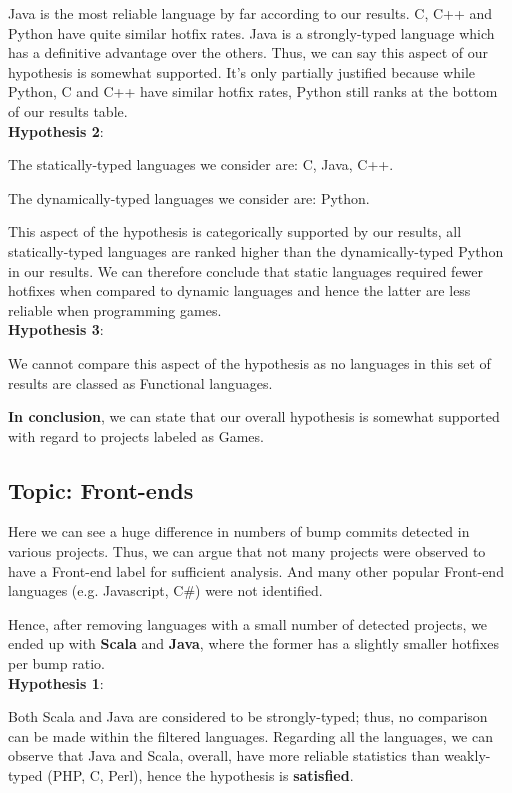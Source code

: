 Java is the most reliable language by far according to our results. C, C++ and Python have quite similar hotfix rates. Java is a strongly-typed language which has a definitive advantage over the others. Thus, we can say this aspect of our hypothesis is somewhat supported. It’s only partially justified because while Python, C and C++ have similar hotfix rates, Python still ranks at the bottom of our results table.\\

\textbf{Hypothesis 2}:\par

The statically-typed languages we consider are: C, Java, C++.\par
The dynamically-typed languages we consider are: Python.\par

This aspect of the hypothesis is categorically supported by our results, all statically-typed languages are ranked higher than the dynamically-typed Python in our results. We can therefore conclude that static languages required fewer hotfixes when compared to dynamic languages and hence the latter are less reliable when programming games.\\

\textbf{Hypothesis 3}:\par
We cannot compare this aspect of the hypothesis as no languages in this set of results are classed as Functional languages.\par

\textbf{In conclusion}, we can state that our overall hypothesis is somewhat supported with regard to projects labeled as Games.

\subsection{Topic: Front-ends}
Here we can see a huge difference in numbers of bump commits detected in various projects. Thus, we can argue that not many projects were observed to have a Front-end label for sufficient analysis. And many other popular Front-end languages (e.g. Javascript, C\#) were not identified.\par
Hence, after removing languages with a small number of detected projects, we ended up with \textbf{Scala} and \textbf{Java}, where the former has a slightly smaller hotfixes per bump ratio.\\

\textbf{Hypothesis 1}:\par
Both Scala and Java are considered to be strongly-typed; thus, no comparison can be made within the filtered languages. 
Regarding all the languages, we can observe that Java and Scala, overall, have more reliable statistics than weakly-typed (PHP, C, Perl), hence the hypothesis is \textbf{satisfied}.\\

